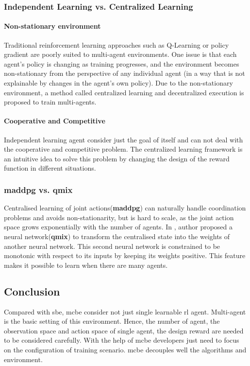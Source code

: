 \subsubsection{Independent Learning vs. Centralized Learning}
\paragraph{Non-stationary environment}
Traditional reinforcement learning approaches such as Q-Learning or policy gradient
are poorly suited to multi-agent environments\parencite{maddpg2017, Rashid2018, en13010123}. One issue is that each agent’s policy is changing as training progresses, and the environment becomes non-stationary from the perspective of any individual agent (in a way that is not explainable by changes in the agent’s own policy).
Due to the non-stationary environment, a method called centralized learning and decentralized execution is proposed to train multi-agents.
\paragraph{Cooperative and Competitive} Independent learning agent consider just the goal of itself and can not deal with the cooperative and competitive problem. The centralized learning framework is an intuitive idea to solve this problem by changing the design of the reward function in different situations.

\subsubsection{\gls{maddpg} vs. \gls{qmix}}
Centralised learning of joint actions(\textbf{\gls{maddpg}}) can naturally handle coordination problems and avoids non-stationarity, but is hard to scale, as the joint action space grows exponentially with the number of agents. In \parencite{Rashid2018}, author proposed a neural network(\textbf{\gls{qmix}}) to transform the centralised state into the weights of another neural network. This second neural network is constrained to be monotonic with respect to its inputs by keeping its weights positive. This feature makes it possible to learn when there are many agents.

\subsection{Conclusion}
Compared with \gls{sbe}, \gls{mcbe} consider not just single learnable \gls{rl} agent. Multi-agent is the basic setting of this environment. Hence, the number of agent, the observation space and action space of single agent, the design reward are needed to be considered carefully. With the help of \gls{mcbe} developers just need to focus on the configuration of training scenario. \gls{mcbe} decouples well the algorithms and environment. 